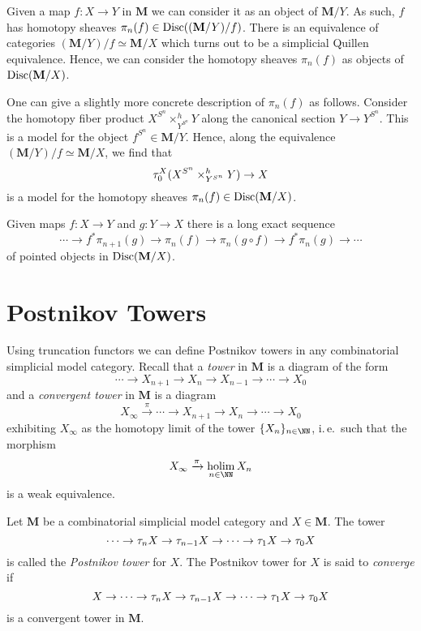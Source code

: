 Given a map \(f\colon X\to Y\) in \(\mathbf M\) we can consider it as an object of \(\mathbf M/Y\). As such, \(f\) has homotopy sheaves \(\pi_{n}(f)\in\operatorname{\textnormal{Disc}}((\mathbf M/Y)/f)\). There is an equivalence of categories \((\mathbf M/Y)/f\simeq \mathbf M/X\) which turns out to be a simplicial Quillen equivalence. Hence, we can consider the homotopy sheaves \(\pi_{n}(f)\) as objects of \(\operatorname{\textnormal{Disc}}(\mathbf M/X)\).

One can give a slightly more concrete description of \(\pi_{n}(f)\) as follows. Consider the homotopy fiber product \(X^{S^{n}}\times^{h}_{Y^{S^{n}}} Y\) along the canonical section \(Y\to Y^{S^{n}}\). This is a model for the object \(f^{S^{n}}\in \mathbf M/Y\). Hence, along the equivalence \((\mathbf M/Y)/f\simeq \mathbf M/X\), we find that
\[\tau_{0}^{X}(X^{S^{n}}\times^{h}_{Y^{S^{n}}} Y)\to X\]
is a model for the homotopy sheaves \(\pi_{n}(f)\in\operatorname{\textnormal{Disc}}(\mathbf M/X)\).

\begin{proposition}
  Given maps \(f\colon X\to Y\) and \(g\colon Y\to X\) there is a long exact sequence
  \[
  \cdots \to f^{*}\pi_{n+1}(g) \to \pi_{n}(f) \to \pi_{n}(g\circ f) \to f^{*}\pi_{n}(g) \to \cdots
  \]
  of pointed objects in \(\operatorname{\textnormal{Disc}}(\mathbf M/X)\).
\end{proposition}

\section{Postnikov Towers}

Using truncation functors we can define Postnikov towers in any combinatorial simplicial model category. Recall that a \emph{tower} in \(\mathbf M\) is a diagram of the form
\[\cdots \to X_{n+1}\to X_{n}\to X_{n-1}\to \cdots \to X_{0} \]
and a \emph{convergent tower} in \(\mathbf M\) is a diagram
\[X_{\infty}\xrightarrow{\pi} \cdots \to X_{n+1}\to X_{n}\to\cdots\to X_{0}\]
exhibiting \(X_{\infty}\) as the homotopy limit of the tower \(\{X_{n}\}_{n\in\NN}\), i.\,e.~such that the morphism
\[X_{\infty}\xrightarrow{\pi}\holim_{n\in\NN} X_{n}\]
is a weak equivalence.

\begin{definition}
  Let \(\mathbf M\) be a combinatorial simplicial model category and \(X\in\mathbf M\). The tower
  \[\cdots\to\tau_{n} X\to\tau_{n-1} X\to\cdots\to\tau_{1} X\to\tau_{0}X\]
  is called the \emph{Postnikov tower} for \(X\). The Postnikov tower for \(X\) is said to \emph{converge} if
  \[X\to\cdots\to\tau_{n} X\to\tau_{n-1} X\to\cdots\to\tau_{1} X\to\tau_{0}X\]
  is a convergent tower in \(\mathbf M\).
\end{definition}

\printbibliography

\listoftodos
